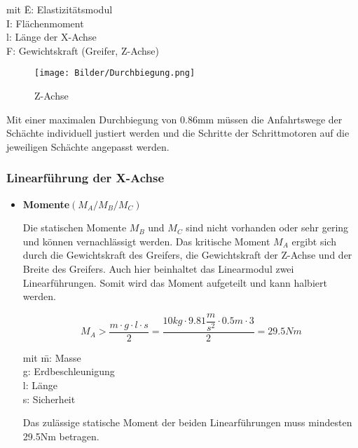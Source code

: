 \documentclass{scrartcl}
\begin{document}
\begin{itemize}
\begin{tabbing}
mit \=E: Elastizitätsmodul\\
		\>I: Flächenmoment\\
		\>l: Länge der X-Achse\\
		\>F: Gewichtskraft (Greifer, Z-Achse)\\
\end{tabbing}



\begin{figure}[htbp] 
  \centering
     \texttt{[image: Bilder/Durchbiegung.png]}
			\caption{Z-Achse}
  \label{fig:Bild1}
\end{figure}
	
Mit einer maximalen Durchbiegung von 0.86mm müssen die Anfahrtswege der Schächte individuell justiert werden und die Schritte der Schrittmotoren auf die jeweiligen Schächte angepasst werden. 









\end{itemize}

\subsubsection{Linearführung der X-Achse}


\begin{itemize}
\item \textbf{Momente$(M_A/M_B/M_C)$}

Die statischen Momente $M_B$ und $M_C$ sind nicht vorhanden oder sehr gering und können vernachlässigt werden. Das kritische Moment $M_A$ ergibt sich durch die Gewichtskraft des Greifers, die Gewichtskraft der Z-Achse und der Breite  des Greifers. Auch hier beinhaltet das Linearmodul zwei Linearführungen. Somit wird das Moment aufgeteilt und kann halbiert werden.


\[M_A>\dfrac{m\cdot g \cdot l \cdot s}{2}=\dfrac{10kg\cdot 9.81\dfrac{m}{s^2}\cdot 0.5m\cdot 3}{2}=29.5Nm\]

\begin{tabbing}
mit \=m: Masse\\
		\>g: Erdbeschleunigung\\
		\>l: Länge\\
		\>s: Sicherheit\\
\end{tabbing}

Das zulässige statische Moment der beiden Linearführungen muss mindesten 29.5Nm betragen.


\end {itemize}
\end{document}
